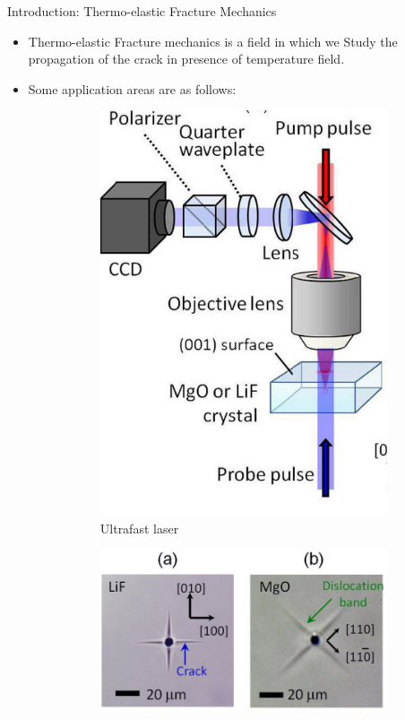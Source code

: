 \documentclass{beamer}
\begin{document}
\begin{frame}[t,fragile]{Introduction: Thermo-elastic Fracture Mechanics}
    \vspace{-.3cm}
    \begin{itemize}
          \item Thermo-elastic Fracture mechanics is a field in which we Study the propagation of the crack in presence of temperature field.
                 \item Some application areas are as follows:
\begin{figure}[H]
      \begin{subfigure}{0.45\textwidth}
    \centering
     \includegraphics[scale=.1]{m}
 \vspace{-.2cm}
 \caption{\tiny Ultrafast laser}
 \end{subfigure}
\begin{subfigure}{0.45\textwidth}
    \centering
     \includegraphics[scale=.1]{l}

\end{subfigure}
\end{figure}
\end{itemize}
\end{frame}
\end{document}
